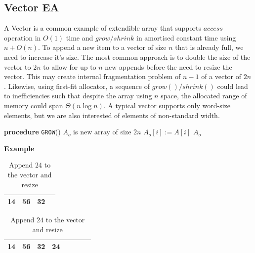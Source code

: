 \subsection{Vector EA}
A Vector is a common example of extendible array that supports $access$ operation in $O(1)$ time and $grow/shrink$ in amortised constant time using $n + O(n)$. To append a new item to a vector of size $n$ that is already full, we need to increase it's size. The most common approach is to double the size of the vector to $2n$ to allow for up to $n$ new appends before the need to resize the vector. This may create internal fragmentation problem of $n-1$ of a vector of $2n$. Likewise, using first-fit allocator, a sequence of $grow()/shrink()$ could lead to inefficiencies such that despite the array using $n$ space, the allocated range of memory could span $\Theta(n \log n)$. A typical vector supports only word-size elements, but we are also interested of elements of non-standard width. \hfill\newline

\begin{table}[ht]
    \centering
    \begin{minipage}[t]{0.4\textwidth}
        \centering
        \begin{algorithm}[H]
            \caption{Grows $A$ by $n$}
            \begin{algorithmic}[1]
                \STATE \textbf{procedure} \texttt{GROW}()
                \STATE $A_o$ is new array of size $2n$
                    \STATE $A_o[i] := A[i]$
                \ENDFOR
                \RETURN $A_o$
            \end{algorithmic}
        \end{algorithm}
    \end{minipage}%
    \hspace{0.1\textwidth}%
    \begin{minipage}[t]{0.5\textwidth}
        \vspace{0.5cm}
        \textbf{Example}\hfill\par\par
        \vspace{0.3cm}
        \begin{tabular}{|c|c|c|c|}
            \hline
             14& 56 & 32 & \\
            \hline
        \end{tabular}
        \newline\newline

        \begin{tabular}{|c|c|c|c|c|c|c|c|}
            \hline
            14 & 56 & 32 & 24 & & & & \\
            \hline
        \end{tabular}

        \caption{Append $24$ to the vector and resize}
    \end{minipage}
\end{table}\par

